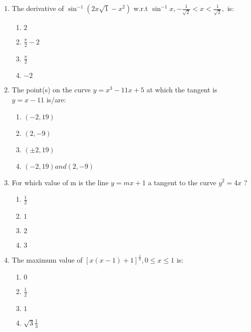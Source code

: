 \begin{enumerate}
\item The derivative of $ \sin^{-1} (2x \sqrt 1 - x^2) $ w.r.t $ \sin^{-1} x,  -\frac{1}{\sqrt 2 } < x < \frac{1}{\sqrt 2},$ is:
  
  	\begin{enumerate}
    	\item $ 2 $
    	\item $ \frac{\pi}{2} -2 $
    	\item $ \frac{\pi}{2} $
    	\item $ -2 $
  	\end{enumerate}

\item The point(s) on the curve  $ y = x^3 - 11x + 5 $ at which the tangent is $ y = x - 11 $ is/are:
  
  	\begin{enumerate}
    	\item $ (-2, 19)$
    	\item $ ( 2, -9)$
    	\item $ (\pm 2, 19) $
    	\item $ (-2 , 19) and (2, -9) $
  	\end{enumerate}

\item For which value of m is the line  $ y = mx + 1 $ a tangent to the curve $ y^2 = 4x $ ?
  
  	\begin{enumerate}
    	\item $ \frac{1}{2} $
    	\item $ 1 $
    	\item $ 2 $
    	\item $ 3 $
  	\end{enumerate}

\item The maximum value  of $ [x(x - 1) + 1]^\frac{1}{3},  0 \le x \le 1 $ is:
  
  	\begin{enumerate}
    	\item $0$
    	\item $\frac{1}{2}$
    	\item $1$
    	\item $\sqrt3  \frac{1}{3}$
  	\end{enumerate}


\end{enumerate}
